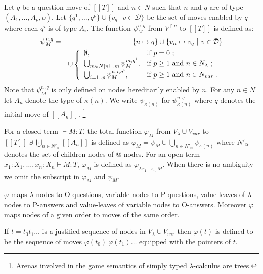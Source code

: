 \documentclass{llncs}
\newcommand\union{\cup}
\newcommand\Union{\bigcup}
\newcommand{\sem}[1]{{[\![ #1 ]\!]}}
\begin{document}
\begin{definition}
\label{def:phi_psi mapping}
Let $q$ be a question move of $\sem{T}$ and $n \in N$ such that $n$ and $q$ are of type
$(A_1,\ldots,A_p,o)$.
Let $\{ q^1, \ldots, q^p \} \union \{  v_q \ | \ v \in \mathcal{D} \}$ be the set of moves enabled by $q$ where each $q^i$
is of type $A_i$. The function $\psi_M^{n,q}$ from $V^{\upharpoonright n}$ to $\sem{T}$ is defined as:
\begin{eqnarray*}
\psi^{n,q}_M &=& \{ n \mapsto q \} \union  \{ v_n \mapsto v_q \ | \ v \in \mathcal{D} \}\\
 &&\union \left\{
                \begin{array}{ll}
                  \emptyset, & \hbox{if $p=0$\ ;} \\
                  \Union_{m \in N | n \vdash_i m} \psi_M^{m, q^i}, & \hbox{if $p\geq1$ and $n\in N_{\lambda}$\ ;} \\
                  \Union_{i=1..p} \psi_M^{n.i, q^i}, & \hbox{if $p\geq1$ and $n\in N_{var}$\ .}
                \end{array}
              \right.
\end{eqnarray*}
Note that $\psi_M^{n,q}$ is only defined on nodes hereditarily enabled by $n$.
For any $n \in N$ let $A_n$ denote the type of $\kappa(n)$. We write $\psi_{\kappa(n)}$ for $\psi_{\kappa(n)}^{n,q}$ where $q$ denotes the initial move of $\sem{A_n}$. \footnote{Arenas involved in the game semantics of simply typed $\lambda$-calculus are trees.}


For a closed term $\vdash M : T$, the total function $\varphi_M$ from $V_\lambda \union V_{var}$ to $\sem{T} \uplus \biguplus_{n \in N'_@} \sem{A_n}$ is defined as $\varphi_M = \psi_M  \union \Union_{n \in N'_@} \psi_{\kappa(n)}$
where $N'_@$ denotes the set of children nodes of @-nodes.
For an open term $x_1 : X_1, \ldots, x_n : X_n \vdash M : T$, $\varphi_M$ is defined as
$\varphi_{\lambda x_1 \ldots x_n . M}$. When there is no ambiguity we omit the subscript in $\varphi_M$ and $\psi_M$.
\end{definition}
\begin{remark}
$\varphi$ maps $\lambda$-nodes to O-questions, variable nodes to
P-questions, value-leaves of $\lambda$-nodes to P-answers and
value-leaves of variable nodes to O-answers.
Moreover $\varphi$ maps nodes of a given order to moves of the same order.
\end{remark}
If $t = t_0 t_1 \ldots$ is a justified sequence
of nodes in $V_\lambda \union V_{var}$ then $\varphi(t)$ is defined
to be the sequence of moves $\varphi(t_0)\ \varphi(t_1) \ldots$
equipped with the pointers of $t$.
\end{document}
